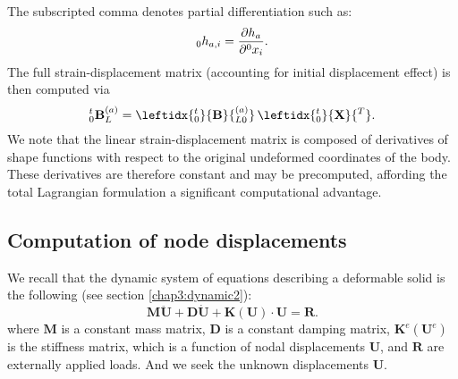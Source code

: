 The subscripted comma denotes partial differentiation such as:
\begin{equation}
_0 h_{a,i} = \dfrac{\partial h_a}{\partial ^0 x_i}.
\end{equation}
The full strain-displacement matrix (accounting for initial displacement effect) is then computed via
\begin{equation}
_0^t\mathbf{B}_{L}^{(a)} = \leftidx{_0^t}{ \mathbf{B} }{_{L0}^{(a)}} \, \leftidx{_0^t}{ \mathbf{X} }{^T}.
\end{equation} 
We note that the linear strain-displacement matrix is composed of derivatives of shape functions with respect to the original undeformed coordinates of the body. These derivatives are therefore constant and may be precomputed, affording the total Lagrangian formulation a significant computational advantage. 

	\subsection{Computation of node displacements} \label{chap5:computeNodalDisp}
We recall that the dynamic system of equations describing a deformable solid is the following (see section \ref{chap3:dynamic2}):
\begin{equation}
\label{chap5:eqDynamic}
\mathbf{M} \mathbf{\ddot U} + \mathbf{D} \mathbf{ \dot U} + \mathbf{K}(\mathbf{U}) \cdot \mathbf{U} = \mathbf{R}.
\end{equation}		
where $ \mathbf{M} $ is a constant mass matrix, $\mathbf{D}$ is a constant damping matrix, $ \mathbf{K}^e(\mathbf{U}^e) $ is the stiffness matrix, which is a function of nodal displacements $\mathbf{U}$, and $\mathbf{R}$ are externally applied loads. And we seek the unknown displacements $ \mathbf{U} $.
	
